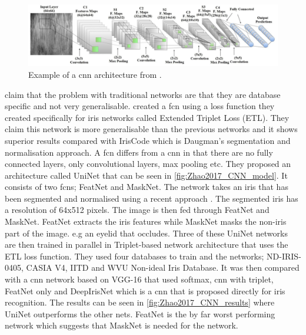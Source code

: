 \begin{figure}[H]
\centering
\includegraphics[width=\textwidth]{figures/Al_Waisy2017_CNN_model.png} 
\caption{Example of a \gls{cnn} architecture  from \cite{Al-Waisy2017}.}
\label{fig:Al_Waisy2017_CNN_model}
\end{figure}


\cite{Zhao2017} claim that the problem with traditional networks are that they are database specific and not very generalisable. \cite{Zhao2017} created a \gls{fcn} using a loss function they created specifically for iris networks called Extended Triplet Loss (ETL). They claim this network is more generalisable than the previous networks and it shows superior results compared with IrisCode which is Daugman's segmentation and normalisation approach. A \gls{fcn} differs from a \gls{cnn} in that there are no fully connected layers, only convolutional layers, max pooling etc. They proposed an architecture called UniNet that can be seen in \autoref{fig:Zhao2017_CNN_model}. It consists of two \gls{fcn}s; FeatNet and MaskNet. The network takes an iris that has been segmented and normalised using a recent approach \citep{Zhao2015a}. The segmented iris has a resolution of 64x512 pixels. The image is then fed through FeatNet and MaskNet. FeatNet extracts the iris features while MaskNet masks the non-iris part of the image. e.g an eyelid that occludes.  Three of these UniNet networks are then trained in parallel in Triplet-based network architecture that uses the ETL loss function. They used four databases to train and the networks; ND-IRIS-0405, CASIA V4, IITD and WVU Non-ideal Iris Database. It was then compared with a \gls{cnn} network based on VGG-16 that used softmax, \gls{cnn} with triplet, FeatNet only and DeepIrisNet which is a \gls{cnn} that is proposed directly for iris recognition. The results can be seen in \autoref{fig:Zhao2017_CNN_results} where UniNet outperforms the other nets. FeatNet is the by far worst performing network which suggests that MaskNet is needed for the network. 

